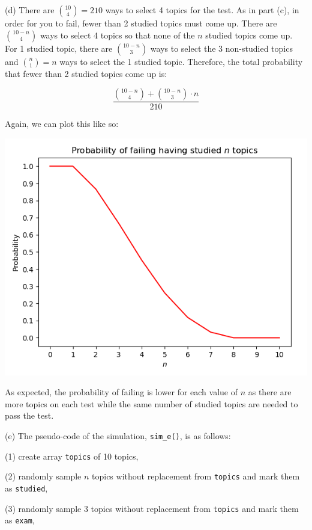\documentclass[10pt]{article}
\begin{document}
\noindent (d) There are ${10 \choose 4} = 210$ ways to select 4 topics for the test. As in part (c), in order for you to fail, fewer than 2 studied topics must come up. There are ${10 - n \choose 4}$ ways to select 4 topics so that none of the $n$ studied topics come up. For 1 studied topic, there are ${10 - n \choose 3}$ ways to select the 3 non-studied topics and ${n \choose 1} = n$ ways to select the 1 studied topic. Therefore, the total probability that fewer than 2 studied topics come up is:

$$\frac{{10 - n \choose 4} + {{10 - n \choose 3} \cdot n}}{210}$$

Again, we can plot this like so:

\begin{center}
    \includegraphics[scale=0.5]{q1_d.png}
\end{center}

As expected, the probability of failing is lower for each value of $n$ as there are more topics on each test while the same number of studied topics are needed to pass the test.

\noindent (e) The pseudo-code of the simulation, \texttt{sim\_e()}, is as follows:

\indent\indent (1) create array \texttt{topics} of 10 topics,

\indent\indent (2) randomly sample $n$ topics without replacement from \texttt{topics} and mark them as \texttt{studied},

\indent\indent (3) randomly sample 3 topics without replacement from \texttt{topics} and mark them as \texttt{exam},
\end{document}
